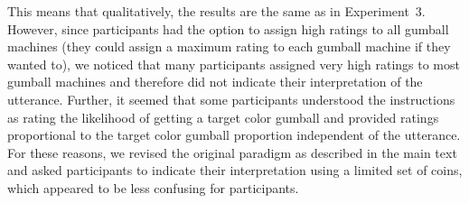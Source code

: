 \documentclass[man, floatsintext]{apa6}
\begin{document}
This means that qualitatively, the results are the same as in Experiment~3. However, since participants had the option to assign high 
ratings to 
all gumball machines (they could assign a maximum rating to each gumball machine if they wanted to), we noticed that many participants assigned very high ratings to most gumball 
machines and therefore did not indicate their interpretation of the utterance. Further, it seemed that some participants
understood the instructions as rating the likelihood of getting a target color gumball and provided ratings proportional to the 
target color gumball proportion independent of the utterance. For these reasons, we revised the original paradigm as described
in the main text and asked participants to indicate their interpretation using a limited set of coins, which appeared to be less
confusing for participants. 
\end{document}
